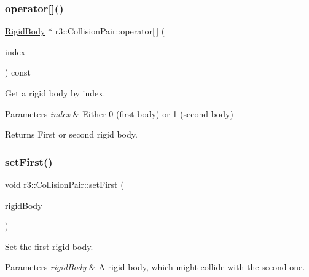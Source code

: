 \subsubsection{\texorpdfstring{operator[]()}{operator[]()}}
{\footnotesize\ttfamily \mbox{\hyperlink{classr3_1_1_rigid_body}{Rigid\+Body}} $\ast$ r3\+::\+Collision\+Pair\+::operator\mbox{[}$\,$\mbox{]} (\begin{DoxyParamCaption}\item[{int}]{index }\end{DoxyParamCaption}) const}



Get a rigid body by index. 


\begin{DoxyParams}{Parameters}
{\em index} & Either 0 (first body) or 1 (second body) \\
\hline
\end{DoxyParams}
\begin{DoxyReturn}{Returns}
First or second rigid body. 
\end{DoxyReturn}
\mbox{\label{classr3_1_1_collision_pair_aed434b37e17c828ac66b69d0f5655fab}} 
\subsubsection{\texorpdfstring{set\+First()}{setFirst()}}
{\footnotesize\ttfamily void r3\+::\+Collision\+Pair\+::set\+First (\begin{DoxyParamCaption}\item[{\mbox{\hyperlink{classr3_1_1_rigid_body}{Rigid\+Body}} $\ast$}]{rigid\+Body }\end{DoxyParamCaption})}



Set the first rigid body. 


\begin{DoxyParams}{Parameters}
{\em rigid\+Body} & A rigid body, which might collide with the second one. \\
\hline
\end{DoxyParams}
\mbox{\label{classr3_1_1_collision_pair_a74c24660f8c0e6553494f419c3cf9ae4}} 
